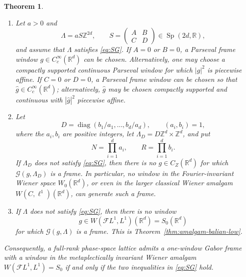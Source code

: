 \documentclass[11pt,reqno]{amsart}
\numberwithin{equation}{section}
\newtheorem{theorem}{Theorem}[section]
\theoremstyle{definition}
\theoremstyle{remark}
\newcommand{\R}{\mathbb R}
\newcommand{\Z}{\mathbb Z}
\newcommand{\G}{\mathcal G}
\newcommand{\Sp}{\operatorname{Sp}}
\newcommand{\CZ}{C_Z}
\newcommand{\Szero}{S_0}
\newcommand{\Wiener}{W(C,\ell^1)}
\newcommand{\Wzero}{W_0}
\begin{document}
\begin{theorem}
\begin{enumerate}[label=(\alph*)]
\item Let $a>0$ and
\[
 \Lambda=aS\Z^{2d},
 \qquad
 S=\begin{pmatrix}A&B\\ C&D\end{pmatrix}\in\Sp(2d,\R),
\]
and assume that $\Lambda$ satisfies \eqref{eq:SG}.  If $A=0$ or $B=0$, a Parseval frame window
$g\in C_c^\infty(\R^d)$ can be chosen.  Alternatively, one may choose a
compactly supported continuous Parseval window for which $|g|^2$ is
piecewise affine.  If $C=0$ or $D=0$, a Parseval frame window can be chosen
so that $\widehat g\in C_c^\infty(\R^d)$; alternatively,
$\widehat g$ may be chosen compactly supported and continuous with
$|\widehat g|^2$ piecewise affine.

\item Let
\[
 D=\operatorname{diag}(b_1/a_1,\ldots,b_d/a_d),
 \qquad (a_i,b_i)=1,
\]
where the $a_i,b_i$ are positive integers, let
$\Lambda_D=D\Z^d\times\Z^d$, and put
\[
 N=\prod_{i=1}^d a_i,
 \qquad
 R=\prod_{i=1}^d b_i.
\]
If $\Lambda_D$ does not satisfy \eqref{eq:SG}, then there is no $g\in\CZ(\R^d)$ for which
$\G(g,\Lambda_D)$ is a frame.  In particular, no window in the
Fourier-invariant Wiener space $\Wzero(\R^d)$, or even in the larger
classical Wiener amalgam $\Wiener(\R^d)$, can generate such a frame.

\item If $\Lambda$ does not satisfy \eqref{eq:SG}, then there is no window
\[
 g\in W(\mathcal F L^1,L^1)(\R^d)=\Szero(\R^d)
\]
for which $\G(g,\Lambda)$ is a frame.  This is
Theorem~\ref{thm:amalgam-balian-low}.
\end{enumerate}
Consequently, a full-rank phase-space lattice admits a one-window Gabor
frame with a window in the metaplectically invariant Wiener amalgam
$W(\mathcal F L^1,L^1)=\Szero$ if and only if the two inequalities in
\eqref{eq:SG} hold.
\end{theorem}
\end{document}

